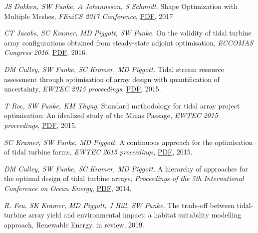 \documentclass[11pt]{article}
\begin{document}
\begin{etaremune}
    \item \textit{JS Dokken, SW Funke, A Johannsson, S Schmidt.} Shape Optimization with Multiple Meshes, \textit{FEniCS 2017 Conference}, \href{https://github.com/funsim/cv/raw/master/publications/fenics_2017_proceedings.pdf}{PDF}, 2017
    \item \textit{CT Jacobs, SC Kramer, MD Piggott, SW Funke.} On the validity of tidal turbine array configurations obtained from steady-state adjoint optimisation, \textit{ECCOMAS Congress 2016}, \href{https://github.com/funsim/cv/raw/master/publications/jacobs_eccomas_2016.pdf}{PDF}, 2016.
    \item \textit{DM Culley, SW Funke, SC Kramer, MD Piggott.} Tidal stream resource assessment through optimisation of array design with quantification of uncertainty, \textit{EWTEC 2015 proceedings}, \href{https://github.com/funsim/cv/raw/master/publications/culley_ewtec_2015.pdf}{PDF}, 2015.
    \item \textit{T Roc, SW Funke, KM Thyng.} Standard methodology for tidal array project optimisation: An idealized study of the Minas Passage, \textit{EWTEC 2015 proceedings}, \href{https://github.com/funsim/cv/raw/master/publications/roc_ewtec_2015.pdf}{PDF}, 2015.
    \item \textit{SC Kramer, SW Funke, MD Piggott.} A continuous approach for the optimisation of tidal turbine farms, \textit{EWTEC 2015 proceedings}, \href{https://github.com/funsim/cv/raw/master/publications/kramer_ewtec_2015.pdf}{PDF}, 2015.
    \item \textit{DM Culley, SW Funke, SC Kramer, MD Piggott.} A hierarchy of approaches for the optimal design of tidal turbine arrays, \textit{Proceedings of the 5th International Conference on Ocean Energy}, \href{https://github.com/funsim/cv/raw/master/publications/culley_ewtec_2015.pdf}{PDF}, 2014.
\end{etaremune}

\begin{etaremune}
\item \textit{R. Feu, SK Kramer, MD Piggott, J Hill, SW Funke.} The trade-off between tidal-turbine array yield and environmental impact: a habitat suitability modelling approach, Renewable Energy, in review, 2019.
\end{etaremune}
\end{document}
